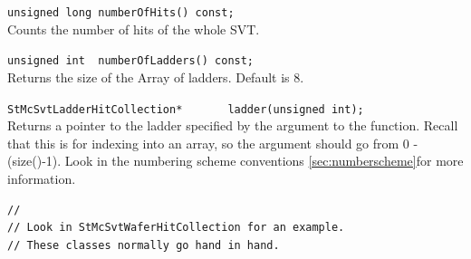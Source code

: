 \begin{Entry}
    \verb+unsigned long numberOfHits() const;+\\
    Counts the number of hits of the whole SVT.

    \verb+unsigned int  numberOfLadders() const;+\\
    Returns the size of the Array of ladders.  Default is 8.

    \verb+StMcSvtLadderHitCollection*       ladder(unsigned int);+\\
    Returns a pointer to the ladder specified by the argument to the
    function.  Recall that this is for indexing into an array, so the
    argument should go from 0 - (size()-1).  Look in the
    numbering scheme conventions \ref{sec:numberscheme}for more information.

\item[Examples]
{\footnotesize
\begin{verbatim}
//
// Look in StMcSvtWaferHitCollection for an example.
// These classes normally go hand in hand.
\end{verbatim}
}%
\end{Entry}

\clearpage
%
%
